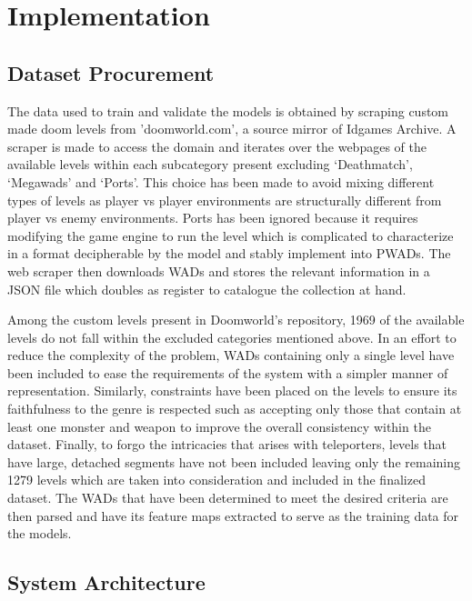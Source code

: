 \documentclass{Configuration_Files/PoliMi3i_thesis}
\begin{document}
\chapter{Implementation}
\label{ch:implementation}%

\section{Dataset Procurement}
The data used to train and validate the models is obtained by scraping custom made 
doom levels from 'doomworld.com', a source mirror of Idgames Archive. A scraper 
is made to access the domain and iterates over the webpages of the available levels 
within each subcategory present excluding ‘Deathmatch’, ‘Megawads’ and ‘Ports’.
This choice has been made to avoid mixing different types of levels as player vs 
player environments are structurally different from player vs enemy environments. 
Ports has been ignored because it requires modifying the game engine to run the 
level which is complicated to characterize in a format decipherable by the model and 
stably implement into PWADs. The web scraper then downloads WADs and stores 
the relevant information in a JSON file which doubles as register to catalogue the 
collection at hand. 

Among the custom levels present in Doomworld’s repository, 1969 of the available 
levels do not fall within the excluded categories mentioned above. In an effort to 
reduce the complexity of the problem, WADs containing only a single level have 
been included to ease the requirements of the system with a simpler manner of 
representation. Similarly, constraints have been placed on the levels to ensure its 
faithfulness to the genre is respected such as accepting only those that contain at least 
one monster and weapon to improve the overall consistency within the dataset. 
Finally, to forgo the intricacies that arises with teleporters, levels that have large, 
detached segments have not been included leaving only the remaining 1279 levels
which are taken into consideration and included in the finalized dataset. The WADs 
that have been determined to meet the desired criteria are then parsed and have its 
feature maps extracted to serve as the training data for the models.
\newpage

\section{System Architecture}
\end{document}
